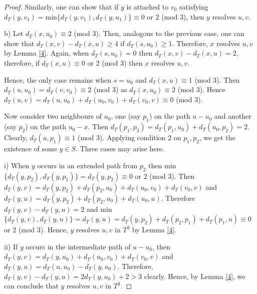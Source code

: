 \documentclass{article}
\theoremstyle{definition}
\numberwithin{equation}{section}
\begin{document}
\begin{proof}
\vspace{0.4em}
Similarly, one can show that if $y$ is attached to $v_{0}$ satisfying $d_{T}(y,v_{1})=\mbox{min}\{d_{T}(y,v_{1}),d_{T}(y,u_{1})\}\equiv 0$ or $2$ (mod $3$), then $y$ resolves $u,v$.

\vspace{0.7em}
\noindent b) Let $d_{T}(x,u_{0})\equiv 2$ (mod $3$).  Then, analogous to the previous case, one can show that $d_{T}(x,v)-d_{T}(x,u)\geq 4$ if $d_{T}(s,u_{0})\geq 1$. Therefore, $x$ resolves $u,v$ by Lemma \ref{4}. Again, when $d_{T}(s,u_{0})=0$ then $d_{T}(x,v)-d_{T}(x,u)=2$, therefore, if $d_{T}(x,u)\equiv 0$ or $2$ (mod $3$) then $x$ resolves $u,v$.

\vspace{0.7em}
Hence, the only case remains when $s=u_{0}$ and $d_{T}(x,u)\equiv 1$ (mod $3$). Then $d_{T}(u,u_{0})=d_{T}(v,v_{0})\equiv 2$ (mod $3$) as $d_{T}(x,u_{0})\equiv 2$ (mod $3$). Hence $d_{T}(u,v)=d_{T}(u,u_{0})+d_{T}(u_{0},v_{0})+d_{T}(v_{0},v)\equiv 0$ (mod $3$). 

\vspace{0.7em}
Now consider two neighbours of $u_{0}$, one (say $p_{1}$) on the path $u-u_{0}$ and another (say $p_{2}$) on the path $u_{0}-x$. Then $d_{T}(p_{1},p_{2})=d_{T}(p_{1},u_{0})+d_{T}(u_{0},p_{2})=2$.
Clearly, $d_{T}(u,p_{1})\equiv 1$ (mod $3$). Applying condition $2$ on $p_{1}, p_{2}$, we get the existence of some $y\in S$.  Three cases may arise here. 

\vspace{0.7em}
\noindent i) When $y$ occurs in an extended path from $p_{2}$ then min
$\{d_{T}(y,p_{2}),d_{T}(y,p_{1})\}=d_{T}(y,p_{2})\equiv 0$ or $2$ (mod $3$).  Then $d_{T}(y,v)=d_{T}(y,p_{2})+d_{T}(p_{2},u_{0})+d_{T}(u_{0},v_{0})+d_{T}(v_{0},v)$ and $d_{T}(y,u)=d_{T}(y,p_{2})+d_{T}(p_{2},u_{0})+d_{T}(u_{0},u)$. Therefore $d_{T}(y,v)-d_{T}(y,u)=2$ and min $\{d_{T}(y,v),d_{T}(y,u)\}=d_{T}(y,u)=d_{T}(y,p_{2})+d_{T}(p_{2},p_{1})+d_{T}(p_{1},u)\equiv 0$ or $2$ (mod $3$). Hence, $y$ resolves $u,v$ in $T^{3}$ by Lemma \ref{4}.



\vspace{0.7em}
\noindent ii) If $y$ occurs in the intermediate path of $u-u_{0}$, then $d_{T}(y,v)=d_{T}(y,u_{0})+d_{T}(u_{0},v_{0})+d_{T}(v_{0},v)$ and $d_{T}(y,u)=d_{T}(u,u_{0})-d_{T}(y,u_{0})$. Therefore, $d_{T}(y,v)-d_{T}(y,u)=2d_{T}(y,u_{0})+2>3$ clearly. Hence, by Lemma \ref{4}, we can conclude that $y$ resolves $u,v$ in $T^{3}$.



\end{proof}
\end{document}
